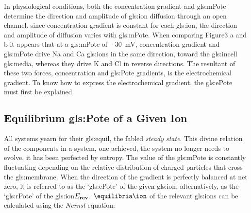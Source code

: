 \documentclass[../../Orator]{subfiles}
\begin{document}
In physiological conditions, both the concentration gradient and \gls{gls:mPote}  determine the direction and amplitude of \gls{gls:ion} diffusion through an open channel. since concentration gradient is constant for each \gls{gls:ion}, the direction and amplitude of diffusion varies with \gls{gls:mPote}. When comparing Figure3 a and b it appears that at a \gls{gls:mPote} of \qty{-30}{\mV}, concentration gradient and \gls{gls:mPote} drive \gls{Na} and \gls{Ca} \glspl{gls:ion} in the same direction, toward the \gls{gls:incell} \gls{gls:media}, whereas they drive \gls{K} and \gls{Cl} in reverse directions. The resultant of these two forces, concentration and \gls{gls:Pote} gradients, is the electrochemical gradient. To know how to express the electrochemical gradient, the \gls{gls:ePote} must first be explained.

\subsection{Equilibrium \gls{gls:Pote} of a Given Ion}
\begingroup
\allowdisplaybreaks
All systems yearn for their \gls{gls:equil}, the fabled \textit{steady state}. This divine relation of the components in a system, one achieved, the system no longer needs to evolve, it has been perfected by entropy. 
The value of the \gls{gls:mPote} is constantly fluctuating depending on the relative distribution of charged particles that cross the \gls{gls:membrane}. 
When the direction of the gradient is perfectly balanced at net zero, it is referred to as the `\gls{gls:ePote}' of the given \gls{gls:ion}\br{\unit{\equilibria\ion}}, alternatively, as the `\gls{gls:rPote}' of the \gls{gls:ion}\(E_{\mathbf{rev}}\). 
\(\unit{\equilibria\ion}\) of the relevant \glspl{gls:ion} can be calculated using the \textit{Nernst} equation:
\end{document}

